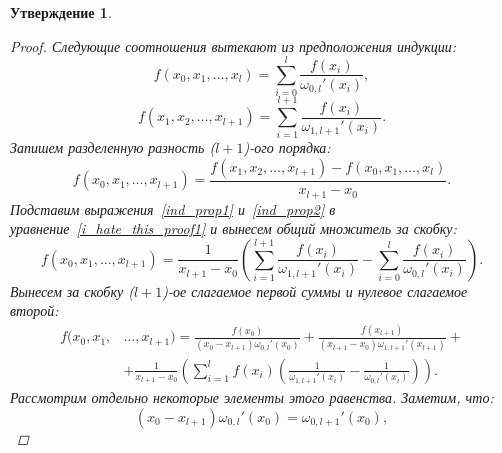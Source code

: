 \documentclass[11pt,a4paper,twoside,listtotoc,bibtotoc]{report}
\numberwithin{equation}{section}
\newtheorem*{statement}{Утверждение}
\theoremstyle{definition}
\theoremstyle{plain}
\begin{document}
\begin{statement}
\begin{proof}
        Следующие соотношения вытекают из предположения индукции:
        \begin{equation}
            \label{ind_prop1}
            f(x_0, x_1, \ldots, x_l)=\sum_{i=0}^{l}{\frac{f(x_i)}
            {\omega_{0,l}'(x_i)}},
        \end{equation}
        \begin{equation}
            \label{ind_prop2}
            f(x_1, x_2, \ldots, x_{l+1})=\sum_{i=1}^{l+1}{\frac{f(x_i)}
            {\omega_{1,l+1}'(x_i)}}.
        \end{equation}
        Запишем разделенную разность ($l+1$)-ого порядка:
        \begin{equation}
            \label{i_hate_this_proof1}
            f(x_0, x_1, \ldots, x_{l+1})=\frac{f(x_1, x_2, \ldots, x_{l+1})-
            f(x_0, x_1, \ldots, x_l)}{x_{l+1} - x_0}.
        \end{equation}
        Подставим выражения~\eqref{ind_prop1} и~\eqref{ind_prop2} в уравнение~\eqref{i_hate_this_proof1} и вынесем общий множитель за скобку:
        $$
            f(x_0, x_1, \ldots, x_{l+1})=\frac{1}{x_{l+1}-x_0}\left(\sum_{i=1}^{l+1}{\frac{f(x_i)}
            {\omega_{1,l+1}'(x_i)}}-\sum_{i=0}^{l}{\frac{f(x_i)}
            {\omega_{0,l}'(x_i)}} \right).
        $$
        Вынесем за скобку ($l+1$)-ое слагаемое первой суммы и нулевое слагаемое второй:
        \begin{equation}
            \begin{split}
                \label{i_hate_this_proof3}
             f(x_0, x_1, &\ldots, x_{l+1}) = \frac{f(x_0)}{(x_0-x_{l+1})
             \omega_{0,l}'(x_0)} +
             \frac{f(x_{l+1})}{(x_{l+1}-x_{0})\omega_{1,l+1}'(x_{l+1})} +\\
             &+ \frac{1}{x_{l+1}-x_0}\left(\sum_{i=1}^{l}{f(x_i) \left(
             \frac{1}{\omega_{1,l+1}'(x_i)} -
             \frac{1}{\omega_{0,l}'(x_i)}\right)}\right).
            \end{split}
        \end{equation}
        Рассмотрим отдельно некоторые элементы этого равенства. Заметим, что:
        $$
            (x_0-x_{l+1})\omega_{0,l}'(x_0)=\omega_{0,l+1}'(x_0),
        $$

\end{proof}
\end{statement}
\end{document}
